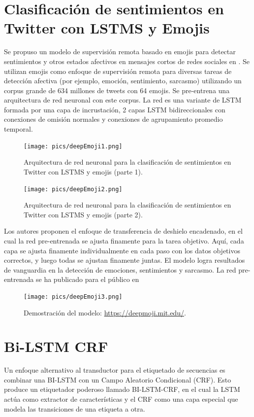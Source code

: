 \section{Clasificación de sentimientos en Twitter con LSTMS y Emojis}
Se propuso un modelo de supervisión remota basado en emojis para detectar sentimientos y otros estados afectivos en mensajes cortos de redes sociales en \cite{FelboMSRL17}. Se utilizan emojis como enfoque de supervisión remota para diversas tareas de detección afectiva (por ejemplo, emoción, sentimiento, sarcasmo) utilizando un corpus grande de 634 millones de tweets con 64 emojis. Se pre-entrena una arquitectura de red neuronal con este corpus. La red es una variante de LSTM formada por una capa de incrustación, 2 capas LSTM bidireccionales con conexiones de omisión normales y conexiones de agrupamiento promedio temporal.

\begin{figure}[h]
  \centering
  \texttt{[image: pics/deepEmoji1.png]}
  \caption{Arquitectura de red neuronal para la clasificación de sentimientos en Twitter con LSTMS y emojis (parte 1).}
\end{figure}

\begin{figure}[h]
  \centering
  \texttt{[image: pics/deepEmoji2.png]}
  \caption{Arquitectura de red neuronal para la clasificación de sentimientos en Twitter con LSTMS y emojis (parte 2).}
\end{figure}

Los autores proponen el enfoque de transferencia de deshielo encadenado, en el cual la red pre-entrenada se ajusta finamente para la tarea objetivo. Aquí, cada capa se ajusta finamente individualmente en cada paso con los datos objetivos correctos, y luego todas se ajustan finamente juntas. El modelo logra resultados de vanguardia en la detección de emociones, sentimientos y sarcasmo. La red pre-entrenada se ha publicado para el público en

\begin{figure}[h]
  \centering
  \texttt{[image: pics/deepEmoji3.png]}
  \caption{Demostración del modelo: \url{https://deepmoji.mit.edu/}.}
\end{figure}

\section{Bi-LSTM CRF}
Un enfoque alternativo al transductor para el etiquetado de secuencias es combinar una BI-LSTM con un Campo Aleatorio Condicional (CRF). Esto produce un etiquetador poderoso \cite{huang2015bidirectional} llamado BI-LSTM-CRF, en el cual la LSTM actúa como extractor de características y el CRF como una capa especial que modela las transiciones de una etiqueta a otra.

